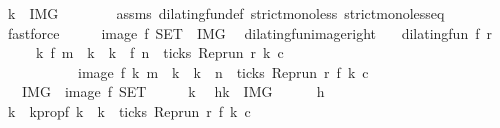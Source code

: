 \begin{isabellebody}
\ {\isacartoucheopen}k\ {\isasymin}\ {\isacharquery}IMG{\isacartoucheclose}\isanewline
\ \ \ \ \ \ \isamarkupfalse%
\ assms\ dilating{\isacharunderscore}fun{\isacharunderscore}def\ strict{\isacharunderscore}mono{\isacharunderscore}less\ strict{\isacharunderscore}mono{\isacharunderscore}less{\isacharunderscore}eq\ \isamarkupfalse%
\ fastforce\isanewline
\ \ \isacommand{{\isacharbraceright}}\isamarkupfalse%
\ \isamarkupfalse%
\ {\isacartoucheopen}image\ f\ {\isacharquery}SET\ {\isasymsubseteq}\ {\isacharquery}IMG{\isacartoucheclose}\ \isacommand{{\isachardot}{\isachardot}}\isamarkupfalse%
\isanewline
{}\isamarkupfalse%
%
\endisatagproof
{\isafoldproof}%
%
\isadelimproof
\isanewline
%
\endisadelimproof
\isanewline
{}\isamarkupfalse%
\ dilating{\isacharunderscore}fun{\isacharunderscore}image{\isacharunderscore}right{\isacharcolon}\isanewline
\ \ \ {\isacartoucheopen}dilating{\isacharunderscore}fun\ f\ r{\isacartoucheclose}\isanewline
\ \ \ \ \ {\isacartoucheopen}{\isacharbraceleft}k{\isachardot}\ f\ m\ {\isacharless}\ k\ {\isasymand}\ k\ {\isasymle}\ f\ n\ {\isasymand}\ ticks\ {\isacharparenleft}{\isacharparenleft}Rep{\isacharunderscore}run\ r{\isacharparenright}\ k\ c{\isacharparenright}{\isacharbraceright}\isanewline
\ \ \ \ \ \ \ \ \ \ {\isacharequal}\ image\ f\ {\isacharbraceleft}k{\isachardot}\ m\ {\isacharless}\ k\ {\isasymand}\ k\ {\isasymle}\ n\ {\isasymand}\ ticks\ {\isacharparenleft}{\isacharparenleft}Rep{\isacharunderscore}run\ r{\isacharparenright}\ {\isacharparenleft}f\ k{\isacharparenright}\ c{\isacharparenright}{\isacharbraceright}{\isacartoucheclose}\isanewline
\ \ {\isacharparenleft}\ {\isacartoucheopen}{\isacharquery}IMG\ {\isacharequal}\ image\ f\ {\isacharquery}SET{\isacartoucheclose}{\isacharparenright}\isanewline
%
\isadelimproof
%
\endisadelimproof
%
\isatagproof
{}\isamarkupfalse%
\isanewline
\ \ \isacommand{{\isacharbraceleft}}\isamarkupfalse%
\ \isamarkupfalse%
\ k\ \isamarkupfalse%
\ h{\isacharcolon}{\isacartoucheopen}k\ {\isasymin}\ {\isacharquery}IMG{\isacartoucheclose}\isanewline
\ \ \ \ \isamarkupfalse%
\ h\ \isamarkupfalse%
\ k\ \ k{}prop{\isacharcolon}{\isacartoucheopen}f\ k\ {\isacharequal}\ k\ {\isasymand}\ ticks\ {\isacharparenleft}{\isacharparenleft}Rep{\isacharunderscore}run\ r{\isacharparenright}\ {\isacharparenleft}f\ k\ c{\isacharparenright}{\isacartoucheclose}\isanewline

\end{isabellebody}

